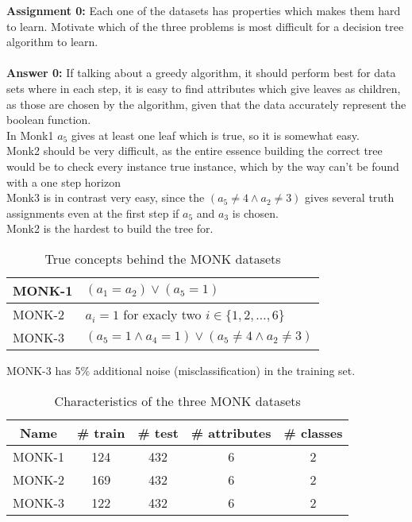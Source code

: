 \documentclass[11pt]{article}
\begin{document}
\begin{tcolorbox}
\textbf{Assignment 0:}
Each one of the datasets has properties which makes them hard to learn.
Motivate which of the three problems is most difficult for a decision
tree algorithm to learn.\\\\
\textbf{Answer 0:} If talking about a greedy algorithm, it should perform best for data sets where in each step, it is easy to find attributes which give leaves as children, as those are chosen by the algorithm, given that the data accurately represent the boolean function.\\In Monk1 $a_5$ gives at least one leaf which is true, so it is somewhat easy.\\Monk2 should be very difficult, as the entire essence building the correct tree would be to check every instance true instance, which by the way can't be found with a one step horizon\\Monk3 is in contrast very easy, since the $(a_5 \neq 4 \land a_2 \neq 3)$ gives several truth assignments even at the first step if $a_5$ and $a_3$ is chosen.\\Monk2 is the hardest to build the tree for.
\end{tcolorbox}

\begin{table}
  \caption{True concepts behind the MONK datasets \label{tab:truemonk}}
  \begin{center}
    \begin{tabular}{|l|l|}
      \hline
      MONK-1 & \((a_1=a_2)\vee(a_5=1)\)\\
      \hline
      MONK-2 & \(a_i=1\) for exacly two \(i \in \{1, 2, \ldots, 6\}\)\\
      \hline
      MONK-3 & \((a_5=1 \wedge a_4=1) \vee (a_5\ne 4 \wedge a_2\ne 3)\)\\
      \hline
    \end{tabular}
  \end{center}
  MONK-3 has 5\% additional noise (misclassification) in the training set.
\end{table}

\begin{table}
  \caption{Characteristics of the three MONK datasets \label{tab:monk}}
  \begin{center}
    \begin{tabular}{|c|c|c|c|c|}\hline
      Name & \# train & \# test & \# attributes & \# classes\\ \hline \hline
      MONK-1 & 124 & 432 & 6 & 2\\ \hline
      MONK-2 & 169 & 432 & 6 & 2\\ \hline
      MONK-3 & 122 & 432 & 6 & 2\\ \hline
    \end{tabular}
  \end{center}
\end{table}
\end{document}
